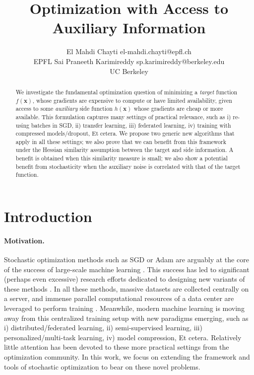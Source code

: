 \documentclass[10pt]{article} %
\title{\centering Optimization with Access to Auxiliary Information}
\author{\name El Mahdi Chayti \email el-mahdi.chayti@epfl.ch \\
      \addr
      EPFL
      \AND
      \name 
Sai Praneeth Karimireddy \email sp.karimireddy@berkeley.edu \\
      \addr UC Berkeley
      }
\theoremstyle{plain}
\theoremstyle{definition}
\theoremstyle{remark}
\def\vx{{\bm{x}}}
\begin{document}
\maketitle

\begin{abstract}
We investigate the fundamental optimization question of minimizing a \emph{target} function $f(\vx)$, whose gradients are expensive to compute or have limited availability, given access to some \emph{auxiliary} side function $h(\vx)$ whose gradients are cheap or more available. This formulation captures many settings of practical relevance, such as i) re-using batches in SGD, ii) transfer learning, iii) federated learning, iv) training with compressed models/dropout, Et cetera. We propose two generic new algorithms that apply in all these settings; we also prove that we can benefit from this framework under the Hessian similarity assumption between the target and side information. A benefit is obtained when this similarity measure is small; we also show a potential benefit from stochasticity when the auxiliary noise is correlated with that of the target function. 

\end{abstract}
\section{Introduction}
\paragraph{Motivation.} Stochastic optimization methods such as SGD \citep{robbins1951stochastic} or Adam \citep{kingma2014adam} are arguably at the core of the success of large-scale machine learning \citep{lecun2015deep,schmidhuber2015deep}. This success has led to significant (perhaps even excessive) research efforts dedicated to designing new variants of these methods \citep{schmidt2020descending}. In all these methods, massive datasets are collected centrally on a server, and immense parallel computational resources of a data center are leveraged to perform training \citep{goyal2017accurate,brown2020language}. Meanwhile, modern machine learning is moving away from this centralized training setup with new paradigms emerging, such as i) distributed/federated learning, ii) semi-supervised learning, iii) personalized/multi-task learning, iv) model compression, Et cetera. Relatively little attention has been devoted to these more practical settings from the optimization community. 
In this work, we focus on extending the framework and tools of stochastic optimization to bear on these novel problems.
\end{document}
